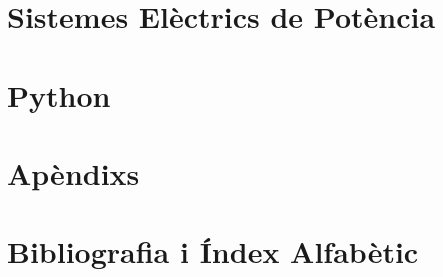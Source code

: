 \documentclass[catalan,a4paper,twoside,11pt]{book}
\begin{document}
   \part{Sistemes Elèctrics de Potència}
      \BgThispage
      
      
      
   \part{Python}
      \BgThispage
      
      
      
   \part{Apèndixs}
      \BgThispage
      \appendix
      \renewcommand*{\chaptername}{\appendixname}
      
      
      
      
      
      
   \part{Bibliografia i  Índex Alfabètic}
      \BgThispage
      \backmatter
      
      \printindex
 
\end{document}
